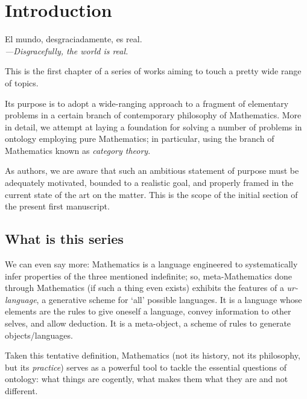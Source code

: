 \section{Introduction}\label{sec_intro}
\epigraph{El mundo, desgraciadamente, es real.\\[2mm]
\footnotesize\emph{---Disgracefully, the world is real.}
}{\cite{confutacion}}
This is the first chapter of a series of works aiming to touch a pretty wide range of topics.

Its purpose is to adopt a wide-ranging approach to a fragment of elementary problems in a certain branch of contemporary philosophy of Mathematics. More in detail, we attempt at laying a foundation for solving a number of problems in ontology employing pure Mathematics; in particular, using the branch of Mathematics known as \emph{category theory}.

As authors, we are aware that such an ambitious statement of purpose must be adequately motivated, bounded to a realistic goal, and properly framed in the current state of the art on the matter. This is the scope of the initial section of the present first manuscript.
\subsection{What is this series}

We can even say more: Mathematics is a language engineered to systematically infer properties of the three mentioned indefinite; so, meta\hyp{}Mathematics done through Mathematics (if such a thing even exists) exhibits the features of a \emph{ur-language}, a generative scheme for `all' possible languages. It is a language whose elements are the rules to give oneself a language, convey information to other selves, and allow deduction. It is a meta-object, a scheme of rules to generate objects/languages.

Taken this tentative definition, Mathematics (not its history, not its philosophy, but its \emph{practice}) serves as a powerful tool to tackle the essential questions of ontology: what things are cogently, what makes them what they are and not different.

